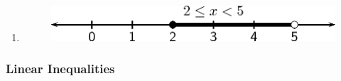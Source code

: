 {\begin{mdframed}[linewidth=4, leftmargin=40, rightmargin=40]
\begin{exercise}
\begin{enumerate}[noitemsep, label=\textbf{Step} \textbf{\arabic*}. ]
      
      \item  
      \label{m39254*id158456}
        
    \setcounter{subfigure}{0}


	\begin{figure}[H] %
    \begin{center}
    \label{m39254*id158459!!!underscore!!!media}\label{m39254*id158459!!!underscore!!!printimage}\includegraphics{col11306.imgs/m39254_MG10C10_005.png} %
        
      \vspace{2pt}
    \vspace{.1in}
    
    \end{center}

 \end{figure}   

    \addtocounter{footnote}{-0}
    
      \par 
      
      \end{enumerate}
         

    \end{exercise}
    \end{mdframed}
    }
    \noindent
  
\label{m39254*secfhsst!!!underscore!!!id4515}
            \subsubsection{  Linear Inequalities }
            \nopagebreak
            
